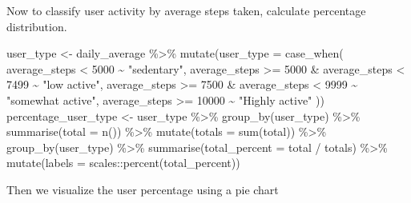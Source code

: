 \documentclass[
]{article}
\newenvironment{Shaded}{\begin{snugshade}}{\end{snugshade}}
\newcommand{\AttributeTok}[1]{\textcolor[rgb]{0.77,0.63,0.00}{#1}}
\newcommand{\DecValTok}[1]{\textcolor[rgb]{0.00,0.00,0.81}{#1}}
\newcommand{\FunctionTok}[1]{\textcolor[rgb]{0.00,0.00,0.00}{#1}}
\newcommand{\NormalTok}[1]{#1}
\newcommand{\OtherTok}[1]{\textcolor[rgb]{0.56,0.35,0.01}{#1}}
\newcommand{\SpecialCharTok}[1]{\textcolor[rgb]{0.00,0.00,0.00}{#1}}
\newcommand{\StringTok}[1]{\textcolor[rgb]{0.31,0.60,0.02}{#1}}
\begin{document}
Now to classify user activity by average steps taken, calculate
percentage distribution.

\begin{Shaded}
\begin{Highlighting}[]
\NormalTok{user\_type }\OtherTok{\textless{}{-}}\NormalTok{ daily\_average }\SpecialCharTok{\%\textgreater{}\%}
  \FunctionTok{mutate}\NormalTok{(}\AttributeTok{user\_type =} \FunctionTok{case\_when}\NormalTok{(}
\NormalTok{    average\_steps }\SpecialCharTok{\textless{}} \DecValTok{5000} \SpecialCharTok{\textasciitilde{}} \StringTok{"sedentary"}\NormalTok{,}
\NormalTok{    average\_steps }\SpecialCharTok{\textgreater{}=} \DecValTok{5000} \SpecialCharTok{\&}\NormalTok{ average\_steps }\SpecialCharTok{\textless{}} \DecValTok{7499} \SpecialCharTok{\textasciitilde{}} \StringTok{"low active"}\NormalTok{, }
\NormalTok{    average\_steps }\SpecialCharTok{\textgreater{}=} \DecValTok{7500} \SpecialCharTok{\&}\NormalTok{ average\_steps }\SpecialCharTok{\textless{}} \DecValTok{9999} \SpecialCharTok{\textasciitilde{}} \StringTok{"somewhat active"}\NormalTok{, }
\NormalTok{    average\_steps }\SpecialCharTok{\textgreater{}=} \DecValTok{10000} \SpecialCharTok{\textasciitilde{}} \StringTok{"Highly active"}
\NormalTok{  ))}
\NormalTok{percentage\_user\_type }\OtherTok{\textless{}{-}}\NormalTok{ user\_type }\SpecialCharTok{\%\textgreater{}\%}
  \FunctionTok{group\_by}\NormalTok{(user\_type) }\SpecialCharTok{\%\textgreater{}\%}
  \FunctionTok{summarise}\NormalTok{(}\AttributeTok{total =} \FunctionTok{n}\NormalTok{()) }\SpecialCharTok{\%\textgreater{}\%}
  \FunctionTok{mutate}\NormalTok{(}\AttributeTok{totals =} \FunctionTok{sum}\NormalTok{(total)) }\SpecialCharTok{\%\textgreater{}\%}
  \FunctionTok{group\_by}\NormalTok{(user\_type) }\SpecialCharTok{\%\textgreater{}\%}
  \FunctionTok{summarise}\NormalTok{(}\AttributeTok{total\_percent =}\NormalTok{ total }\SpecialCharTok{/}\NormalTok{ totals) }\SpecialCharTok{\%\textgreater{}\%}
  \FunctionTok{mutate}\NormalTok{(}\AttributeTok{labels =}\NormalTok{ scales}\SpecialCharTok{::}\FunctionTok{percent}\NormalTok{(total\_percent))}
\end{Highlighting}
\end{Shaded}

Then we visualize the user percentage using a pie chart
\end{document}
